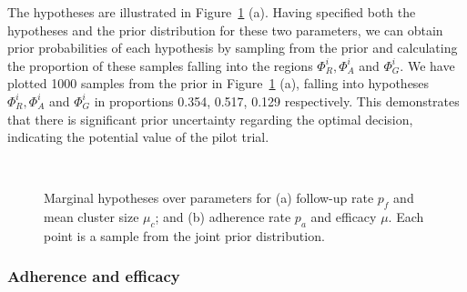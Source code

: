 \documentclass[AMA,STIX1COL]{WileyNJD-v2}
\begin{document}
The hypotheses are illustrated in Figure~\ref{fig:hyps} (a). Having specified both the hypotheses and the prior distribution for these two parameters, we can obtain prior probabilities of each hypothesis by sampling from the prior and calculating the proportion of these samples falling into the regions $\Phi^i_R, \Phi^i_A$ and $\Phi^i_G$. We have plotted 1000 samples from the prior in Figure~\ref{fig:hyps} (a), falling into hypotheses  $\Phi^i_R, \Phi^i_A$ and $\Phi^i_G$ in proportions 0.354, 0.517, 0.129 respectively. This demonstrates that there is significant prior uncertainty regarding the optimal decision, indicating the potential value of the pilot trial.

\begin{figure}
   \centering
   \quad
   \\
   \caption{Marginal hypotheses over parameters for (a) follow-up rate $p_{f}$ and mean cluster size $\mu_{c}$; and (b) adherence rate $p_{a}$ and efficacy $\mu$. Each point is a sample from the joint prior distribution.}
   \label{fig:hyps}
\end{figure}

\subsubsection{Adherence and efficacy}
\end{document}
